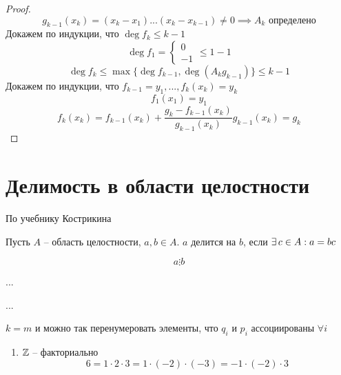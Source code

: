 \begin{proof}
    $$ g_{k-1} (x_k) = (x_k - x_1)...(x_k-x_{k-1}) \ne 0 \implies A_k \text{ определено} $$
    Докажем по индукции, что $\deg f_k \le k - 1$
    $$ \deg f_1 = \begin{cases} 0 \\ - 1 \end{cases} \le 1 - 1 $$
    $$ \deg f_k \le \max \{ \deg f_{k-1}, \deg (A_k g_{k-1}) \} \le k - 1 $$
    Докажем по индукции, что $f_{k-1} = y_1,...,f_k(x_k) = y_k$
    $$ f_1(x_1) = y_1 $$
    $$ f_k(x_k) = f_{k-1}(x_k) + \frac{g_k - f_{k-1}(x_k)}{g_{k-1}(x_k)}g_{k-1}(x_k) = g_k $$
\end{proof}

\section{Делимость в области целостности}
По учебнику Кострикина

\begin{definition}
	Пусть $A$ -- область целостности, $a,b \in A$. $a$ делится на $b$, если $\exists\, c \in A: a = bc$
\end{definition}

\begin{notation}
	$$ a \vdots b $$
\end{notation}

\begin{properties}
    ...

\end{properties}
...

$k = m$ и можно так перенумеровать элементы, что $q_i$ и $p_i$ ассоциированы $\forall i$

\begin{eg}
    \begin{enumerate}
    	\item $\mathbb{Z}$ -- факториально \\
        $$6 = 1 \cdot 2 \cdot 3 = 1 \cdot (-2) \cdot (-3) = -1 \cdot (-2) \cdot 3$$
    \end{enumerate}

\end{eg}
